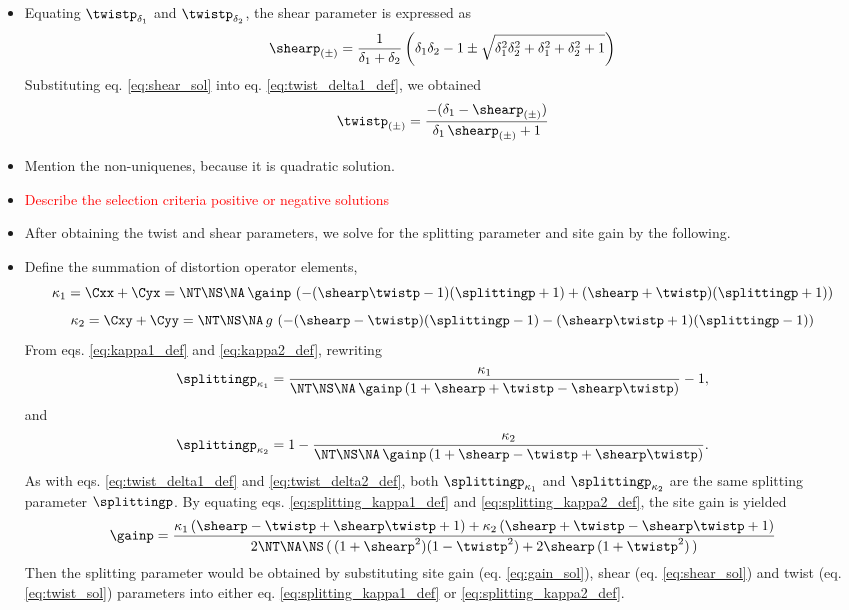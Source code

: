 \begin{itemize}
	\item Equating $\twistp_{\delta_1}$ and $\twistp_{\delta_2}$, the shear parameter is expressed as
	\begin{equation}\label{eq:shear_sol}
		\shearp_{(\pm)} = \frac{1}{\delta_1+\delta_2} \left( \delta_1\delta_2 -1 \pm \sqrt{\delta_1^2 \delta_2^2 + \delta_1^2 + \delta_2^2 + 1} \right)
	\end{equation}
	Substituting eq. \eqref{eq:shear_sol} into eq. \eqref{eq:twist_delta1_def}, we obtained
	\begin{equation}\label{eq:twist_sol}
		\twistp_{(\pm)} = \frac{-(\delta_1 - \shearp_{(\pm)})}{\delta_1\,\shearp_{(\pm)}+1}
	\end{equation}
	\item Mention the non-uniquenes, because it is quadratic solution.
	\item \textcolor{red}{Describe the selection criteria positive or negative solutions}
	\item After obtaining the twist and shear parameters, we solve for the splitting parameter and site gain by the following.
	\item Define the summation of distortion operator elements, 
	\begin{equation}\label{eq:kappa1_def}
		\kappa_1 = \Cxx + \Cyx = \NT\NS\NA\,\gainp\,\left( -(\shearp \twistp-1)(\splittingp+1) + (\shearp+\twistp)(\splittingp+1) \right) 
	\end{equation}
	\begin{equation}\label{eq:kappa2_def}
		\kappa_2 = \Cxy + \Cyy = \NT\NS\NA\,g\,\left( -(\shearp - \twistp)(\splittingp - 1) - (\shearp\twistp+1)(\splittingp-1) \right) 
	\end{equation}
	From eqs. \eqref{eq:kappa1_def} and \eqref{eq:kappa2_def}, rewriting 
	\begin{equation}\label{eq:splitting_kappa1_def}	
		\splittingp_{\kappa_1} = \frac{\kappa_1}{\NT\NS\NA\,\gainp\,(1+\shearp+\twistp-\shearp\twistp)} - 1,
	\end{equation}
	and
	\begin{equation}\label{eq:splitting_kappa2_def}	
		\splittingp_{\kappa_2} = 1- \frac{\kappa_2}{\NT\NS\NA\,\gainp\,(1+\shearp-\twistp+\shearp\twistp)}.
	\end{equation}	
	As with eqs. \eqref{eq:twist_delta1_def} and \eqref{eq:twist_delta2_def}, both $\splittingp_{\kappa_1}$ and $\splittingp_{\kappa_2}$ are the same splitting parameter $\splittingp$.
	By equating eqs. \eqref{eq:splitting_kappa1_def} and \eqref{eq:splitting_kappa2_def}, the site gain is yielded
	\begin{equation}\label{eq:gain_sol}
		\gainp=\frac{\kappa_1\,(\shearp-\twistp+\shearp\twistp + 1) + \kappa_2\,(\shearp+\twistp-\shearp\twistp+1)}{2\NT\NA\NS\,(\,(1+\shearp^2)(1-\twistp^2) + 2\shearp\,(1+\twistp^2)\,)}
	\end{equation}
	Then the splitting parameter would be obtained by substituting site gain (eq. \ref{eq:gain_sol}), shear (eq. \ref{eq:shear_sol}) and twist (eq. \ref{eq:twist_sol}) parameters into either eq. \eqref{eq:splitting_kappa1_def} or \eqref{eq:splitting_kappa2_def}.
\end{itemize}

